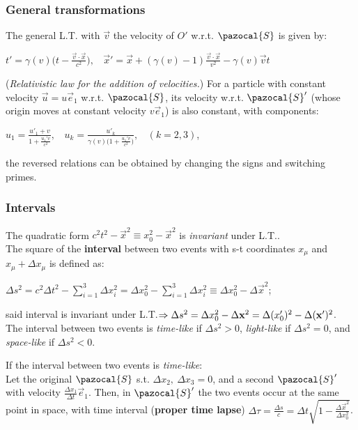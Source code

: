 \subsubsection*{General transformations}
The general L.T. with $\vec{v}$ the velocity of $O'$ w.r.t. $\pazocal{S}$ is given by:\\
\centerline{$t'=\gamma(v)\Big(t-\frac{\vec{v}\cdot \vec{x}}{c^{2}}\Big),\ \ \ \ \vec{x}'=\vec{x}+(\gamma(v)-1)\frac{\vec{v}\cdot \vec{x}}{v^{2}}-\gamma(v)\vec{v}t$}

(\emph{Relativistic law for the addition of velocities.}) For a particle with constant velocity $\vec{u}=u\vec{e}_{1}$ w.r.t. $\pazocal{S}$, its velocity w.r.t. $\pazocal{S}'$ (whose origin moves at constant  velocity $v\vec{e}_{1}$) is also constant, with components:\\
\centerline{$u_{1}=\frac{u'_{1}+v}{1+\frac{u_{1}'v}{c^{2}}},\ \ \ \ u_{k}=\frac{u'_{k}}{\gamma(v)\Big(1+\frac{u_{1}'v}{c^{2}}\Big)},\ \ \ \ (k=2,3)$,}
the reversed relations can be obtained by changing the signs and switching primes.



\subsubsection*{Intervals}
The quadratic form $c^{2}t^{2}-\vec{x}^{2}\equiv x_{0}^{2}-\vec{x}^{2}$ is \emph{invariant} under L.T..\\
The square of the \textbf{interval} between two events with s-t coordinates $x_{\mu}$ and $x_{\mu}+\Delta x_{\mu}$ is defined as:\\
\centerline{$\Delta s^{2}=c^{2}\Delta t^{2}-\sum\limits_{i=1}^{3}\Delta x_{i}^{2}=\Delta x_{0}^{2}-\sum\limits_{i=1}^{3}\Delta x_{i}^{2}\equiv \Delta x_{0}^{2}-\Delta \vec{x}^{2}$;}
said interval is invariant under L.T.$\Rightarrow \Delta s^{2}=\Delta x_{0}^{2}-\Delta \mathbf{x}^{2}=\Delta (x_{0}')^{2}-\Delta (\mathbf{x}')^{2}$.\\
The interval between two events is \emph{time-like} if $\Delta s^{2}>0$, \emph{light-like} if $\Delta s^{2}=0$, and \emph{space-like} if $\Delta s^{2}<0$.
\smallskip


If the interval between two events is \emph{time-like}:\\
Let the original $\pazocal{S}$ s.t. $\Delta x_{2},\ \Delta x_{3}=0$, and a second $\pazocal{S}'$ with velocity $\frac{\Delta x_{1}}{\Delta t}\vec{e}_{1}$. Then, in $\pazocal{S}'$ the two events occur at the same point in space, with time interval (\textbf{proper time lapse}) $\Delta\tau=\frac{\Delta s}{c}=\Delta t\sqrt{1-\frac{\Delta \vec{x}^{2}}{\Delta x_{0}^{2}}}$.
\smallskip


